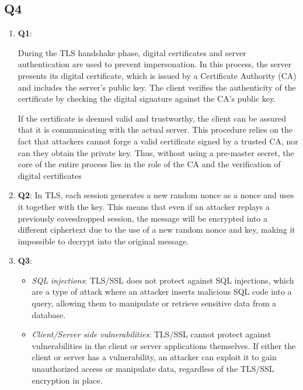 \documentclass{article}
\begin{document}
\subsection{Q4}

	\begin{enumerate}
		\item \textbf{Q1}: 

		During the TLS handshake phase, digital certificates and server authentication are used to prevent impersonation. In this process, the server presents its digital certificate, which is issued by a Certificate Authority (CA) and includes the server's public key. The client verifies the authenticity of the certificate by checking the digital signature against the CA's public key.

		If the certificate is deemed valid and trustworthy, the client can be assured that it is communicating with the actual server. This procedure relies on the fact that attackers cannot forge a valid certificate signed by a trusted CA, nor can they obtain the private key. Thus, without using a pre-master secret, the core of the entire process lies in the role of the CA and the verification of digital certificates

		\item \textbf{Q2}:
		In TLS, each session generates a new random nonce as a nonce and uses it together with the key\cite{5-2.security-protocol}. This means that even if an attacker replays a previously eavesdropped session, the message will be encrypted into a different ciphertext due to the use of a new random nonce and key, making it impossible to decrypt into the original message. 

		\item \textbf{Q3}:
			\begin{itemize}
				\item \textit{SQL injections}: TLS/SSL does not protect against SQL injections, which are a type of attack where an attacker inserts malicious SQL code into a query, allowing them to manipulate or retrieve sensitive data from a database\cite{5-2.security-protocol}.

				\item \textit{Client/Server side vulnerabilities}: TLS/SSL cannot protect against vulnerabilities in the client or server applications themselves\cite{5-2.security-protocol}. If either the client or server has a vulnerability, an attacker can exploit it to gain unauthorized access or manipulate data, regardless of the TLS/SSL encryption in place.
			\end{itemize}

	\end{enumerate}
\end{document}
